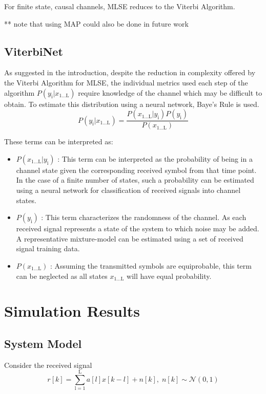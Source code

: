 \documentclass[12pt,a4paper]{report}
\begin{document}
For finite state, causal channels, MLSE reduces to the Viterbi Algorithm. 





** note that using MAP could also be done in future work
\subsection{ViterbiNet}
As suggested in the introduction, despite the reduction in complexity offered by the Viterbi Algorithm for MLSE, the individual metrics used each step of the algorithm 
$P(y_{\mathrm{i}}|x_{\mathrm{1 ... L}}) $ require knowledge of the channel which may be difficult to obtain. To estimate this distribution using a neural network, Baye's Rule is used. 
\begin{equation}
P(y_{\mathrm{i}}|x_{\mathrm{1 ... L}}) = 
\frac
{P(x_{\mathrm{1 ... L}}|y_{\mathrm{i}})P(y_{\mathrm{i}})}
{P(x_{\mathrm{1 ... L}})}
\end{equation}

These terms can be interpreted as:

\begin{itemize}
\item $P(x_{\mathrm{1 ... L}}|y_{\mathrm{i}})$
: This term can be interpreted as the probability of being in a channel state given the corresponding received symbol from that time point. In the case of a finite number of states, such a probability can be estimated using a neural network for classification of received signals into channel states. 
\item $P(y_{\mathrm{i}})$
: This term characterizes the randomness of the channel. As each received signal represents a state of the system to which noise may be added. A representative mixture-model can be estimated using a set of received signal training data. 
\item $P(x_{\mathrm{1 ... L}})$
: Assuming the transmitted symbols are equiprobable, this term can be neglected as all states $x_{\mathrm{1 ... L}}$ will have equal probability. 

\end{itemize}






\section{Simulation Results}
\subsection{System Model}
Consider the received signal 
\begin{equation}
r[k] = \sum_{\mathrm{l=1}}^{\mathrm{L}} a[l]x[k-l] + n[k], \; n[k]  \sim \mathcal{N}(0,1)
\end{equation}
\end{document}
